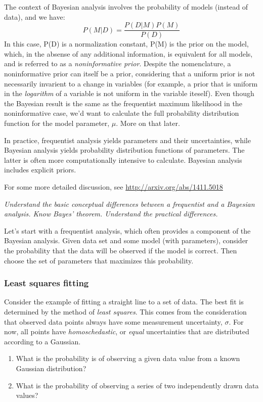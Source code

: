 \documentclass{article}
\newcommand{\test}[1]{%
    \begin{center}
        \colorbox{hl}{\parbox{0.9\textwidth}{\emph{\centering #1}}}
    \end{center}}
\begin{document}
The context of Bayesian analysis involves the probability of models
(instead of data), and we have:
\[
    P(M|D) = \frac{P(D|M)P(M)}{P(D)}
    \]
In this case, P(D) is a normalization constant, P(M) is the prior on the model,
which, in the absense of any additional information, is equivalent for all
models, and is referred to as a \textit{noninformative prior}. Despite the
nomenclature, a noninformative prior can itself be a prior, considering that a
uniform prior is not necessarily invarient to a change in variables (for
example, a prior that is uniform in the \emph{logarithm} of a variable is not
uniform in the variable iteself). Even though the Bayesian result is the same
as the frequentist maximum likelihood in the noninformative case, we'd want to
calculate the full probability distribution function for the model parameter,
$\mu$. More on that later.

In practice, frequentist analysis yields parameters and their
uncertainties, while Bayesian analysis yields probability distribution
functions of parameters. The latter is often more computationally
intensive to calculate. Bayesian analysis includes explicit priors.

For some more detailed discussion, see
\url{http://arxiv.org/abs/1411.5018}

\test{Understand the basic conceptual differences between a frequentist
and a Bayesian analysis. Know Bayes' theorem. Understand the practical
differences.}

Let's start with a frequentist analysis, which often provides a component of
the Bayesian analysis. Given data set and some model (with
parameters), consider the probability that the data will be observed if the
model is correct. Then choose the set of parameters that maximizes this
probability.

\subsubsection{Least squares fitting}
Consider the example of fitting a straight line to a set of data. The best fit
is determined by the method of \textit{least squares}. This comes from the
consideration that observed data points always have some measurement
uncertainty, $\sigma$.
For now, all points have \textit{homoschedastic}, or
\textit{equal} uncertainties that are distributed according to a Gaussian.
\begin{enumerate}
    \item What is the probability is of observing a given data value from a
        known Gaussian distribution?
    \item What is the probability of observing a
        series of two independently drawn data values?
\end{enumerate}
\end{document}
